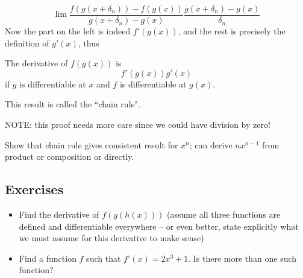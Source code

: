 \[\label{eq:chainRule2}
\lim \frac{f(g(x+\delta_n)) - f(g(x))}{g(x+\delta_n)-g(x)} \frac{g(x+\delta_n)-g(x)}{\delta_n}
\]
Now the part on the left is indeed $f'(g(x))$, and the rest is precisely the definition of $g'(x)$, thus
\begin{thm}
The derivative of $f(g(x))$ is
\[
f'(g(x))g'(x)
\]
if $g$ is differentiable at $x$ and $f$ is differentiable at $g(x)$.
\end{thm}
This result is called the ``chain rule".
{\color{red} NOTE: this proof needs more care since we could have division by zero!

Show that chain rule gives consistent result for $x^n$; can derive $nx^{n-1}$ from product or composition or directly.}





\subsection{Exercises}
\begin{itemize}
\item Find the derivative of $f(g(h(x)))$ (assume all three functions are defined and differentiable everywhere -- or even better, state explicitly what we must assume for this derivative to make sense)
\item Find a function $f$ such that $f'(x) = 2x^3+1$. Is there more than one such function?
\end{itemize}


